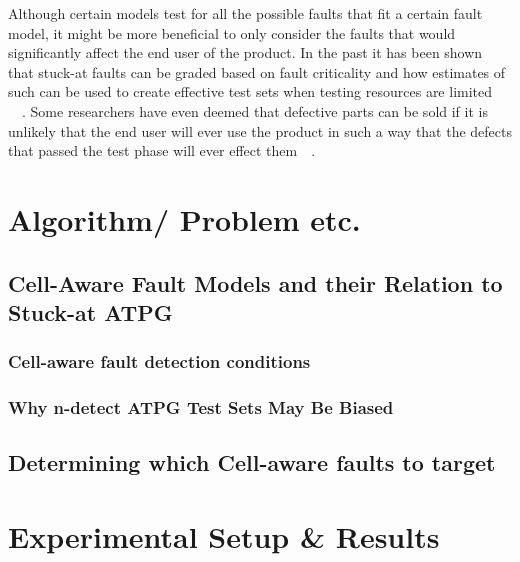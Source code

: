 \documentclass[10 pt, technote]{IEEEtran}
\begin{document}
	Although certain models test for all the possible faults that fit a certain fault model, it might be more beneficial to only consider the faults that would significantly affect the end user of the product. In the past it has been shown that stuck-at faults can be graded based on fault criticality and how estimates of such can be used to create effective test sets when testing resources are limited ~\cite{5469545}~\cite{4641197}. Some researchers have even deemed that defective parts can be sold if it is unlikely that the end user will ever use the product in such a way that the defects that passed the test phase will ever effect them~\cite{Breuer:1985:KBS:317825.317868}~\cite{Hsieh:2007:RDA:1266366.1266717}. 
	
	
	
	  






\section{Algorithm/ Problem etc.}

\subsection{Cell-Aware Fault Models and their Relation to Stuck-at ATPG}

\subsubsection{Cell-aware fault detection conditions}

\subsubsection{Why n-detect ATPG Test Sets May Be Biased}

\subsection{Determining which Cell-aware faults to target}

\section{Experimental Setup \& Results}
\end{document}
